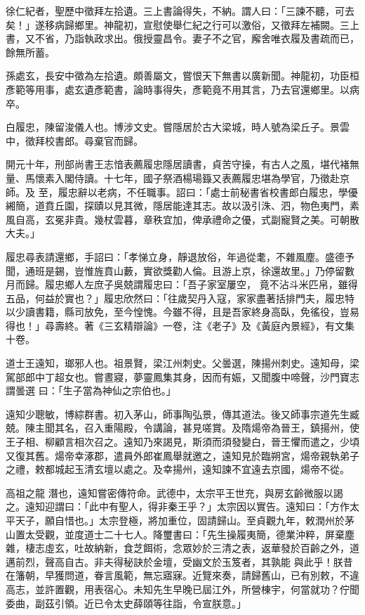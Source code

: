 \begin{pinyinscope}
 徐仁紀者，聖歷中徵拜左拾遺。三上書論得失，不納。謂人曰：「三諫不聽，可去矣！」遂移病歸鄉里。神龍初，宣慰使舉仁紀之行可以激俗，又徵拜左補闕。三上書，又不省，乃詣執政求出。俄授靈昌令。妻子不之官，廨舍唯衣履及書疏而已，餘無所蓄。



 孫處玄，長安中徵為左拾遺。頗善屬文，嘗恨天下無書以廣新聞。神龍初，功臣桓彥範等用事，處玄遺彥範書，論時事得失，彥範竟不用其言，乃去官還鄉里。以病卒。



 白履忠，陳留浚儀人也。博涉文史。嘗隱居於古大梁城，時人號為梁丘子。景雲中，徵拜校書郎。尋棄官而歸。



 開元十年，刑部尚書王志愔表薦履忠隱居讀書，貞苦守操，有古人之風，堪代褚無量、馬懷素入閣侍讀。十七年，國子祭酒楊瑒籙又表薦履忠堪為學官，乃徵赴京師。及
 至，履忠辭以老病，不任職事。詔曰：「處士前秘書省校書郎白履忠，學優緗簡，道賁丘園，探賾以見其微，隱居能達其志。故以汲引洙、泗，物色夷門，素風自高，玄冕非貴。幾杖雲暮，章秩宜加，俾承禮命之優，式副寵賢之美。可朝散大夫。」



 履忠尋表請還鄉，手詔曰：「孝悌立身，靜退放俗，年過從耄，不雜風塵。盛德予聞，通班是錫，豈惟旌賁山藪，實欲獎勸人倫。且游上京，徐還故里。」乃停留數月而歸。履忠鄉人左庶子吳兢謂履忠曰：「吾子家室屢空，
 竟不沾斗米匹帛，雖得五品，何益於實也？」履忠欣然曰：「往歲契丹入寇，家家盡著括排門夫，履忠特以少讀書籍，縣司放免，至今惶愧。今雖不得，且是吾家終身高臥，免徭役，豈易得也！」尋壽終。著《三玄精辯論》一卷，注《老子》及《黃庭內景經》，有文集十卷。



 道士王遠知，瑯邪人也。祖景賢，梁江州刺史。父曇選，陳揚州刺史。遠知母，梁駕部郎中丁超女也。嘗晝寢，夢靈鳳集其身，因而有娠，又聞腹中啼聲，沙門寶志謂曇選
 曰：「生子當為神仙之宗伯也。」



 遠知少聰敏，博綜群書。初入茅山，師事陶弘景，傳其道法。後又師事宗道先生臧兢。陳主聞其名，召入重陽殿，令講論，甚見嗟賞。及隋煬帝為晉王，鎮揚州，使王子相、柳顧言相次召之。遠知乃來謁見，斯須而須發變白，晉王懼而遣之，少頃又復其舊。煬帝幸涿郡，遣員外郎崔鳳舉就邀之，遠知見於臨朔宮，煬帝親執弟子之禮，敕都城起玉清玄壇以處之。及幸揚州，遠知諫不宜遠去京國，煬帝不從。



 高祖之龍
 潛也，遠知嘗密傳符命。武德中，太宗平王世充，與房玄齡微服以謁之。遠知迎謂曰：「此中有聖人，得非秦王乎？」太宗因以實告。遠知曰：「方作太平天子，願自惜也。」太宗登極，將加重位，固請歸山。至貞觀九年，敕潤州於茅山置太受觀，並度道士二十七人。降璽書曰：「先生操履夷簡，德業沖粹，屏棄塵雜，棲志虛玄，吐故納新，食芝餌術，念眾妙於三清之表，返華發於百齡之外，道邁前烈，聲高自古。非夫得秘訣於金壇，受幽文於玉笈者，其孰能
 與此乎！朕昔在籓朝，早獲問道，眷言風範，無忘寤寐。近覽來奏，請歸舊山，已有別敕，不違高志，並許置觀，用表宿心。未知先生早晚已屆江外，所營棟宇，何當就功？佇聞委曲，副茲引領。近已令太史薛頤等往詣，令宣朕意。」




\end{pinyinscope}
